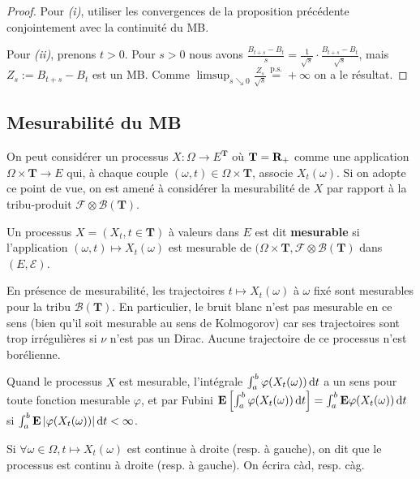 	\begin{proof}
		Pour \textit{(i)}, utiliser les convergences de la proposition précédente conjointement avec la continuité du MB.
		
		Pour \textit{(ii)}, prenons $t > 0$.
		Pour $s > 0$ nous avons $\frac{B_{t+s} - B_t}{s} = \frac{1}{\sqrt{s}} \cdot \frac{B_{t+s} - B_t}{\sqrt{s}}$, mais $Z_s := B_{t + s} - B_t$ est un MB.
		Comme $\limsup_{s \searrow 0} \frac{Z_s}{\sqrt{s}} \overset{\text{p.s.}}{=} +\infty$ on a le résultat.
	\end{proof}


\subsection{Mesurabilité du MB}

	On peut considérer un processus $X \colon \Omega \to E^{\mathbf{T}}$ où $\mathbf{T} = \mathbf{R}_+$ comme une application $\Omega \times \mathbf{T} \to E$ qui, à chaque couple $(\omega,t) \in \Omega \times \mathbf{T}$, associe $X_t(\omega)$.
	Si on adopte ce point de vue, on est amené à considérer la mesurabilité de $X$ par rapport à la tribu-produit $\mathcal{F} \otimes \mathcal{B}(\mathbf{T})$.
	
	\begin{defn}
		Un processus $X = (X_t, t \in \mathbf{T})$ à valeurs dans $E$ est dit \textbf{mesurable} si l'application $(\omega,t) \mapsto X_t(\omega)$ est mesurable de $(\Omega \times \mathbf{T}, \mathcal{F} \otimes \mathcal{B}(\mathbf{T})$ dans $(E,\mathcal{E})$.
	\end{defn}
	
	En présence de mesurabilité, les trajectoires $t \mapsto X_t(\omega)$ à $\omega$ fixé sont mesurables pour la tribu $\mathcal{B}(\mathbf{T})$.
	En particulier, le bruit blanc n'est pas mesurable en ce sens (bien qu'il soit mesurable au sens de Kolmogorov) car ses trajectoires sont trop irrégulières si $\nu$ n'est pas un Dirac.
	Aucune trajectoire de ce processus n'est borélienne.
	
	Quand le processus $X$ est mesurable, l'intégrale $\int_a^b \varphi(X_t(\omega)) \mathop{}\mathopen{}\mathrm{d} t$ a un sens pour toute fonction mesurable $\varphi$, et par Fubini $\mathbf{E} \left[ \int_a^b \varphi(X_t(\omega)) \mathop{}\mathopen{}\mathrm{d} t \right] = \int_a^b \mathbf{E} \varphi(X_t(\omega)) \mathop{}\mathopen{}\mathrm{d} t$ si $\int_a^b \mathbf{E} \left\lvert\varphi(X_t(\omega))\right\rvert \mathop{}\mathopen{}\mathrm{d} t < \infty$.
	
	\begin{note}
		Si $\forall \omega \in \Omega, t \mapsto X_t(\omega)$ est continue à droite (resp. à gauche), on dit que le processus est continu à droite (resp. à gauche).
		On écrira càd, resp. càg.
	\end{note}
	
